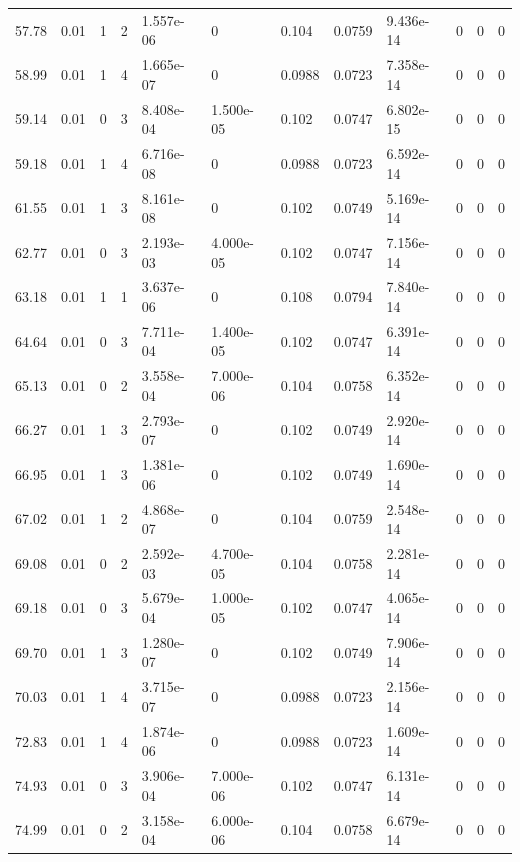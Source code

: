 \documentclass[preview]{standalone}
\begin{document}
{{{\begin{tabular}{L{1.2cm}C{1.2cm} C{0.3cm}C{0.5cm} C{1.4cm}C{1.4cm} C{1.4cm}C{1.4cm} C{1.6cm}C{1.6cm} C{1.6cm}C{1.6cm}}
  57.78  &  0.01  & 1     &  2 &  1.557e-06  & 0  &  0.104&   0.0759& 9.436e-14 & 0   &  0 & 0  \\ 
  58.99  &  0.01  & 1     &  4 &  1.665e-07  & 0  &  0.0988&   0.0723& 7.358e-14 & 0   &  0 & 0  \\ 
  59.14  &  0.01  & 0     &  3 &  8.408e-04  & 1.500e-05  &  0.102&   0.0747& 6.802e-15 & 0   &  0 & 0  \\ 
  59.18  &  0.01  & 1     &  4 &  6.716e-08  & 0  &  0.0988&   0.0723& 6.592e-14 & 0   &  0 & 0  \\ 
  61.55  &  0.01  & 1     &  3 &  8.161e-08  & 0  &  0.102&   0.0749& 5.169e-14 & 0   &  0 & 0  \\ 
  62.77  &  0.01  & 0     &  3 &  2.193e-03  & 4.000e-05  &  0.102&   0.0747& 7.156e-14 & 0   &  0 & 0  \\ 
  63.18  &  0.01  & 1     &  1 &  3.637e-06  & 0  &  0.108&   0.0794& 7.840e-14 & 0   &  0 & 0  \\ 
  64.64  &  0.01  & 0     &  3 &  7.711e-04  & 1.400e-05  &  0.102&   0.0747& 6.391e-14 & 0   &  0 & 0  \\ 
  65.13  &  0.01  & 0     &  2 &  3.558e-04  & 7.000e-06  &  0.104&   0.0758& 6.352e-14 & 0   &  0 & 0  \\ 
  66.27  &  0.01  & 1     &  3 &  2.793e-07  & 0  &  0.102&   0.0749& 2.920e-14 & 0   &  0 & 0  \\ 
  66.95  &  0.01  & 1     &  3 &  1.381e-06  & 0  &  0.102&   0.0749& 1.690e-14 & 0   &  0 & 0  \\ 
  67.02  &  0.01  & 1     &  2 &  4.868e-07  & 0  &  0.104&   0.0759& 2.548e-14 & 0   &  0 & 0  \\ 
  69.08  &  0.01  & 0     &  2 &  2.592e-03  & 4.700e-05  &  0.104&   0.0758& 2.281e-14 & 0   &  0 & 0  \\ 
  69.18  &  0.01  & 0     &  3 &  5.679e-04  & 1.000e-05  &  0.102&   0.0747& 4.065e-14 & 0   &  0 & 0  \\ 
  69.70  &  0.01  & 1     &  3 &  1.280e-07  & 0  &  0.102&   0.0749& 7.906e-14 & 0   &  0 & 0  \\ 
  70.03  &  0.01  & 1     &  4 &  3.715e-07  & 0  &  0.0988&   0.0723& 2.156e-14 & 0   &  0 & 0  \\ 
  72.83  &  0.01  & 1     &  4 &  1.874e-06  & 0  &  0.0988&   0.0723& 1.609e-14 & 0   &  0 & 0  \\ 
  74.93  &  0.01  & 0     &  3 &  3.906e-04  & 7.000e-06  &  0.102&   0.0747& 6.131e-14 & 0   &  0 & 0  \\ 
  74.99  &  0.01  & 0     &  2 &  3.158e-04  & 6.000e-06  &  0.104&   0.0758& 6.679e-14 & 0   &  0 & 0  \\ 

\end{tabular}}}}
\end{document}
